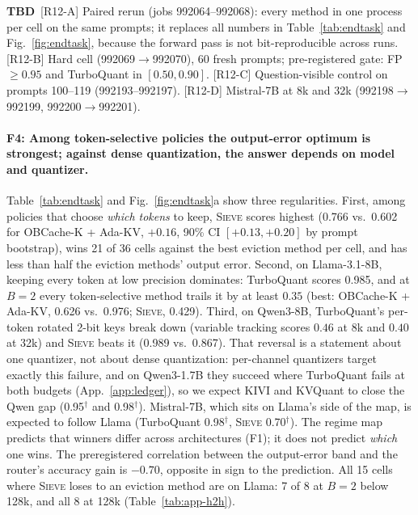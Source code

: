 \documentclass{article}
\newcommand{\tbd}[1]{{\color{tbdcol}\textbf{TBD}~#1}}
\newcommand{\est}[1]{{\color{estcol}#1$^{\dagger}$}}
\newcommand{\sieve}{\textsc{Sieve}}
\theoremstyle{definition}
\begin{document}
\tbd{[R12-A] Paired rerun (jobs 992064--992068): every method in one process per cell on the same prompts; it replaces all numbers in Table~\ref{tab:endtask} and Fig.~\ref{fig:endtask}, because the forward pass is not bit-reproducible across runs. [R12-B] Hard cell (992069$\to$992070), 60 fresh prompts; pre-registered gate: FP $\ge0.95$ and TurboQuant in $[0.50,0.90]$. [R12-C] Question-visible control on prompts 100--119 (992193--992197). [R12-D] Mistral-7B at 8k and 32k (992198$\to$992199, 992200$\to$992201).}

\paragraph{F4: Among token-selective policies the output-error optimum is strongest; against dense quantization, the answer depends on model and quantizer.}
Table~\ref{tab:endtask} and Fig.~\ref{fig:endtask}a show three regularities.  First, among policies that choose \emph{which tokens} to keep, \sieve{} scores highest (0.766 vs.\ 0.602 for OBCache-K + Ada-KV, $+0.16$, 90\% CI $[+0.13,+0.20]$ by prompt bootstrap), wins 21 of 36 cells against the best eviction method per cell, and has less than half the eviction methods' output error.  Second, on Llama-3.1-8B, keeping every token at low precision dominates: TurboQuant scores 0.985, and at $B=2$ every token-selective method trails it by at least $0.35$ (best: OBCache-K + Ada-KV, 0.626 vs.\ 0.976; \sieve{}, 0.429).  Third, on Qwen3-8B, TurboQuant's per-token rotated 2-bit keys break down (variable tracking scores $0.46$ at 8k and $0.40$ at 32k) and \sieve{} beats it (0.989 vs.\ 0.867).  That reversal is a statement about one quantizer, not about dense quantization: per-channel quantizers target exactly this failure, and on Qwen3-1.7B they succeed where TurboQuant fails at both budgets (App.~\ref{app:ledger}), so we expect KIVI and KVQuant to close the Qwen gap (\est{0.95} and \est{0.98}).  Mistral-7B, which sits on Llama's side of the map, is expected to follow Llama (TurboQuant \est{0.98}, \sieve{} \est{0.70}).  The regime map predicts that winners differ across architectures (F1); it does not predict \emph{which} one wins.  The preregistered correlation between the output-error band and the router's accuracy gain is $-0.70$, opposite in sign to the prediction.  All 15 cells where \sieve{} loses to an eviction method are on Llama: 7 of 8 at $B=2$ below 128k, and all 8 at 128k (Table~\ref{tab:app-h2h}).
\end{document}
